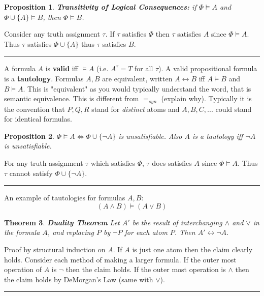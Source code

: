 \documentclass[twoside]{article}
\newcounter{lecnum}
\newtheorem{theorem}{Theorem}[lecnum]
\newtheorem{proposition}[theorem]{Proposition}
\newenvironment{proof}{{\bf Proof:}}{\hfill\rule{2mm}{2mm}}
\begin{document}
\begin{proposition}
\textbf{Transitivity of Logical Consequences:} if $\Phi \vDash A$ and $\Phi \cup \{A\} \vDash B$, then $\Phi \vDash B$. 
\end{proposition}
\begin{proof}
Consider any truth assignment $\tau$. If $\tau$ satisfies $\Phi$ then $\tau$ satisfies $A$ since $\Phi \vDash A$. Thus $\tau$ satisfies $\Phi \cup \{A\}$ thus $\tau$ satisfies $B$. 
\end{proof}

A formula $A$ is \textbf{valid} iff $\vDash A$ (i.e. $A^{\tau} = T$ for all $\tau$). A valid propositional formula is a \textbf{tautology}. Formulas $A, B$ are equivalent, written $A \longleftrightarrow B$ iff $A \vDash B$ and $B \vDash A$. This is "equivalent" as you would typically understand the word, that is semantic equivalence. This is different from $=_{syn}$ (explain why). Typically it is the convention that $P, Q, R$ stand for \emph{distinct} atoms and $A, B, C,...$ could stand for identical formulas. 

\begin{proposition}
$\Phi \vDash A \iff \Phi \cup \{\lnot A\}$ is unsatisfiable. Also $A$ is a tautology iff $\lnot A$ is unsatisfiable. 
\end{proposition}
\begin{proof}
For any truth assignment $\tau$ which satisfies $\Phi$, $\tau$ does satisfies $A$ since $\Phi \vDash A$. Thus $\tau$ cannot satisfy $\Phi \cup \{\lnot A\}$. 
\end{proof}

An example of tautologies for formulas $A, B$:
\[(A \land B) \vDash (A \lor B)\]

\begin{theorem}
\textbf{Duality Theorem} Let $A'$ be the result of interchanging $\land$ and $\lor$ in the formula $A$, and replacing $P$ by $\lnot P$ for each atom $P$. Then $A' \longleftrightarrow \lnot A$.
\end{theorem}
\begin{proof}
Proof by structural induction on $A$. If $A$ is just one atom then the claim clearly holds. Consider each method of making a larger formula. If the outer most operation of $A$ is $\lnot$ then the claim holds. If the outer most operation is $\land$ then the claim holds by DeMorgan's Law (same with $\lor$).
\end{proof}
\end{document}
